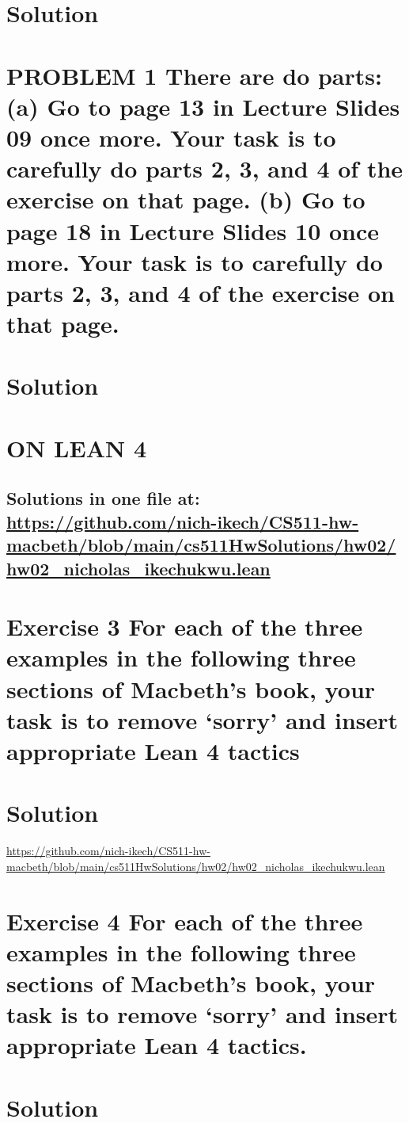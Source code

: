 \documentclass{article}
\begin{document}
\section*{Solution}


\newpage
\section*{PROBLEM 1 There are do parts:
(a) Go to page 13 in Lecture Slides 09 once more. Your task is to carefully do parts 2, 3, and 4
of the exercise on that page.
(b) Go to page 18 in Lecture Slides 10 once more. Your task is to carefully do parts 2, 3, and 4
of the exercise on that page.}
\section*{Solution}



\newpage
\section*{ON LEAN 4}
\subsection*{Solutions in one file at: 
\url{https://github.com/nich-ikech/CS511-hw-macbeth/blob/main/cs511HwSolutions/hw02/hw02_nicholas_ikechukwu.lean}}

\newpage

\section*{Exercise 3 For each of the three examples in the following three sections of Macbeth’s book, your
task is to remove ‘sorry’ and insert appropriate Lean 4 tactics}
\section*{Solution}
\url{https://github.com/nich-ikech/CS511-hw-macbeth/blob/main/cs511HwSolutions/hw02/hw02_nicholas_ikechukwu.lean}

\newpage

\section*{Exercise 4 For each of the three examples in the following three sections of Macbeth’s book, your
task is to remove ‘sorry’ and insert appropriate Lean 4 tactics.}
\section*{Solution}
\end{document}
